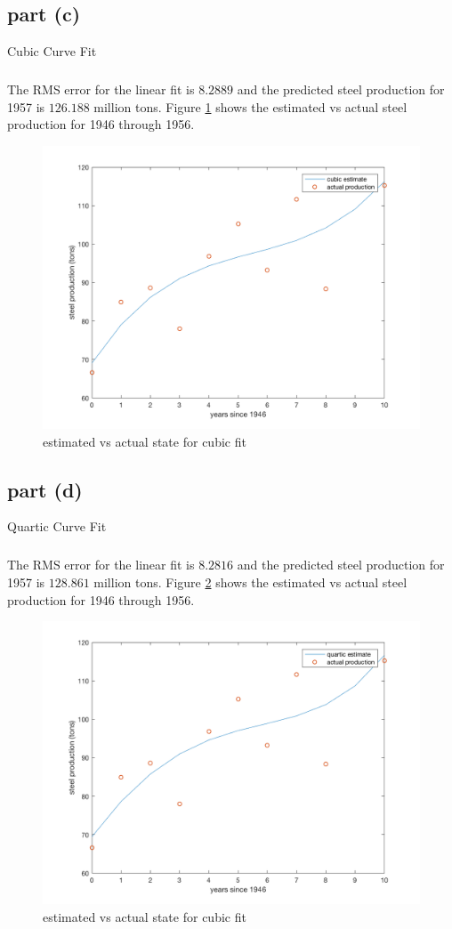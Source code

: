 \documentclass[11pt]{article}
\begin{document}
\subsection*{part (c)}
Cubic Curve Fit

\subparagraph*{}
The RMS error for the linear fit is $8.2889$ and the predicted steel production for 1957 is $126.188$ million tons. Figure \ref{p1_plot3} shows the estimated vs actual steel production for 1946 through 1956.
\begin{figure}[h!]
	\centering
	\includegraphics[width=0.8\linewidth]{p1_plot3.png}
	\caption{estimated vs actual state for cubic fit}
	\label{p1_plot3}
\end{figure}

\subsection*{part (d)}
Quartic Curve Fit

\subparagraph*{}
The RMS error for the linear fit is $8.2816$ and the predicted steel production for 1957 is $128.861$ million tons. Figure \ref{p1_plot4} shows the estimated vs actual steel production for 1946 through 1956.
\begin{figure}[h!]
	\centering
	\includegraphics[width=0.8\linewidth]{p1_plot4.png}
	\caption{estimated vs actual state for cubic fit}
	\label{p1_plot4}
\end{figure}
\end{document}
